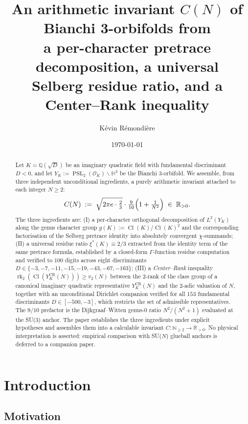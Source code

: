 \documentclass[11pt,a4paper,reqno]{amsart}
\title[An arithmetic invariant of Bianchi 3-orbifolds]{%
An arithmetic invariant $C(N)$ of Bianchi 3-orbifolds from\\
a per-character pretrace decomposition, a universal\\
Selberg residue ratio, and a Center--Rank inequality}
\author{K\'evin R\'emondi\`ere}
\date{\today}
\theoremstyle{definition}
\DeclareMathOperator{\PSL}{PSL}
\DeclareMathOperator{\Cl}{Cl}
\DeclareMathOperator{\rk}{rk}
\newcommand{\OK}{\mathcal{O}_K}
\newcommand{\HH}{\mathbb{H}}
\newcommand{\RR}{\mathbb{R}}
\newcommand{\QQ}{\mathbb{Q}}
\newcommand{\NN}{\mathbb{N}}
\newcommand{\YK}{Y_K}
\newcommand{\gK}{g(K)}
\newcommand{\xis}{\xi^{*}}
\newcommand{\vtwo}{v_2}
\newcommand{\YKCR}{Y_K^{\mathrm{CR}}}
\newcommand{\Cinv}{C}
\begin{document}
\begin{abstract}
Let $K=\QQ(\sqrt{D})$ be an imaginary quadratic field with fundamental
discriminant $D<0$, and let $\YK := \PSL_2(\OK)\backslash\HH^3$ be the Bianchi
3-orbifold.  We assemble, from three independent unconditional ingredients, a
purely arithmetic invariant attached to each integer $N\ge 2$:
\[
   \Cinv(N) \;:=\; \sqrt{2\pi e \cdot \tfrac{2}{3}} \cdot \tfrac{9}{10}
       \Bigl(1 + \tfrac{1}{N^{2}}\Bigr) \;\in\; \RR_{>0}.
\]
The three ingredients are:
(I) a per-character orthogonal decomposition of $L^{2}(\YK)$ along the genus
character group $\gK := \Cl(K)/\Cl(K)^{2}$ and the corresponding factorisation
of the Selberg pretrace identity into absolutely convergent $\chi$-summands;
(II) a universal residue ratio $\xis(K) \equiv 2/3$ extracted from the
identity term of the same pretrace formula, established by a closed-form
$\Gamma$-function residue computation and verified to $100$ digits across eight
discriminants $D\in\{-3,-7,-11,-15,-19,-43,-67,-163\}$; (III) a
\emph{Center--Rank} inequality $\rk_{2}(\Cl(\YKCR(N))) \ge \vtwo(N)$ between
the 2-rank of the class group of a canonical imaginary quadratic representative
$\YKCR(N)$ and the 2-adic valuation of $N$, together with an unconditional
Dirichlet companion verified for all $153$ fundamental discriminants
$D\in[-500,-3]$, which restricts the set of admissible representatives.  The
$9/10$ prefactor is the Dijkgraaf--Witten genus-$0$ ratio $N^{2}/(N^{2}+1)$
evaluated at the SU(3) anchor.  The paper establishes the three ingredients
under explicit hypotheses and assembles them into a calculable invariant
$\Cinv:\NN_{\ge 2}\to\RR_{>0}$.  No physical interpretation is asserted:
empirical comparison with SU($N$) glueball anchors is deferred to a companion
paper.
\end{abstract}

\maketitle

\section{Introduction}\label{sec:intro}

\subsection{Motivation}\label{ss:motivation}
\end{document}
